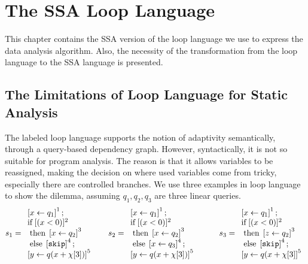 \chapter{The SSA Loop Language}
\label{ch:adapt-ssa}

 This chapter contains the SSA version of the loop language we use to express the data analysis algorithm. Also, the necessity of the transformation from the loop language to the SSA language is presented.

\section{The Limitations of {Loop} Language for Static Analysis}
\label{sec:adapt-limit}
 The labeled {loop} language supports the notion of adaptivity semantically, through a query-based dependency graph. However, syntactically, it is not so suitable for program analysis. The reason is that it allows variables to be reassigned, making the decision on where used variables come from tricky, especially there are controlled branches. We use three examples in {loop} language to show the dilemma, assuming $q_1,q_2,q_3$ are three linear queries.
%
\[
 s_1 = \begin{array}{l}
      \left[  \mathrel{ x \leftarrow q_1 } \right]^{1} ; \\
      \mbox{if\;}  [(x < 0 )]^{2} \\
      \mbox{\;then\;} \left[ \mathrel{ x \leftarrow q_2 } \right]^{3}\\
      \mbox{\;else\;} \left[ \mathtt{skip} \right]^{4} ; \\
      \left[ \mathrel{ y \leftarrow q(x+\chi[3]) } \right]^{5}
 \end{array}
 ~~~~~
  s_2 = \begin{array}{l}
      \left[  \mathrel{ x \leftarrow q_1 } \right]^{1} ; \\
      \mbox{if\;}  [(x < 0 )]^{2} \\
      \mbox{\;then\;} \left[ \mathrel{ x \leftarrow q_2 } \right]^{3}\\
      \mbox{\;else\;} \left[ \mathrel{ x \leftarrow q_3 } \right]^{4} ; \\
      \left[ \mathrel{ y \leftarrow q(x+\chi[3]) } \right]^{5}
 \end{array}
 ~~~~~~~~
  s_3 = \begin{array}{l}
      \left[  \mathrel{ x \leftarrow q_1 } \right]^{1} ; \\
      \mbox{if\;}  [(x < 0 )]^{2} \\
      \mbox{\;then\;} \left[ \mathrel{ z \leftarrow q_2 } \right]^{3}\\
      \mbox{\;else\;} \left[ \mathtt{skip} \right]^{4} ; \\
      \left[ \mathrel{ y \leftarrow q(x+\chi[3] } \right]^{5}
 \end{array}
\]

